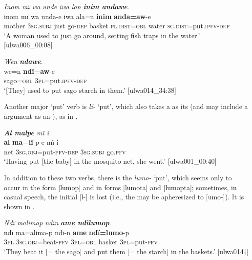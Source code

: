 \ea%
    \label{ex:phrase:73}
          \textit{Inom mï wa unde iwa lan \textbf{inim andawe}}.\\
\gll inom  mï      wa  unda-e  iwa      ala=n      \textbf{inim} \textbf{anda=aw}{}-e\\
    mother  3\textsc{sg.subj}  just  go-\textsc{dep}  basket  \textsc{pl.dist}=\textsc{obl}  water    \textsc{sg.dist}=put.\textsc{ipfv-dep}\\
\glt `A woman used to just go around, setting fish traps in the water.’ [ulwa006\_00:08]
\z

\ea%
    \label{ex:phrase:74}
          \textit{Wen} \textbf{\textit{ndawe}}.\\
\gll we=n    \textbf{ndï=aw}{}-e\\
    sago=\textsc{obl}  3\textsc{pl}=put.\textsc{ipfv-dep}\\
\glt `[They] used to put sago starch in them.’ [ulwa014\_34:38]
\z

Another major ‘put’ verb is \textit{lï-} ‘put’, which also takes a  as its  (and may include a  argument as an  ), as in .


\ea%
    \label{ex:phrase:76}
         \textit{\textbf{Al malpe} mï i.}\\
\gll    \textbf{al}  \textbf{ma=lï}{}-p-e        mï      i\\
    net  3\textsc{sg.obj}=put-\textsc{pfv-dep}  \textsc{3sg.subj}  go.\textsc{pfv}\\
\glt `Having put [the baby] in the mosquito net, she went.’ [ulwa001\_00:40]
\z


 In addition to these two verbs, there is the   \textit{lumo-} ‘put’, which seems only to occur in the  form [lumop] and in  forms [lumota] and [lumopta]; sometimes, in casual speech, the initial [l-] is lost (i.e., the  may be  apheresized to [umo-]). It is shown in .

\ea%
    \label{ex:phrase:75}
          \textit{Ndï malimap ndïn} \textbf{\textit{ame ndïlumop}}.\\
\gll ndï  ma=alima-p    ndï-n    \textbf{ame}    \textbf{ndï=lumo}{}-p\\
    3\textsc{pl}  \textsc{3sg.obj=}beat-\textsc{pfv}  \textsc{3pl=obl}  basket  3\textsc{pl}=put-\textsc{pfv}\\
\glt `They beat it [= the sago] and put them [= the starch] in the baskets.’ [ulwa014†]
\z

